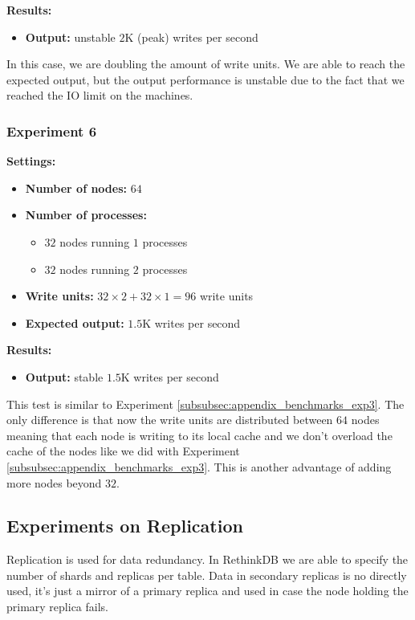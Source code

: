 \medskip
\noindent\textbf{Results:}
\begin{itemize}
 \item \textbf{Output:} unstable $2$K (peak) writes per second
\end{itemize}

In this case, we are doubling the amount of write units. 
We are able to reach the expected output, but the output performance is unstable due to the fact that we reached the IO limit on the machines. 

\subsubsection{Experiment 6}\label{subsubsec:appendix_benchmarks_exp6}
\medskip
\noindent\textbf{Settings:}
\begin{itemize}
 \item \textbf{Number of nodes:} $64$
 \item \textbf{Number of processes:}
 \begin{itemize}
  \item$32$ nodes running $1$ processes
  \item$32$ nodes running $2$ processes
 \end{itemize}
 \item \textbf{Write units:} $32 \times 2 + 32 \times 1 = 96$ write units
 \item \textbf{Expected output:} $1.5$K writes per second
\end{itemize}

\medskip
\noindent\textbf{Results:}
\begin{itemize}
 \item \textbf{Output:} stable $1.5$K writes per second
\end{itemize}

This test is similar to Experiment \ref{subsubsec:appendix_benchmarks_exp3}. 
The only difference is that now the write units are distributed between $64$ nodes meaning that each node is writing to its local cache and we don't overload the cache of the nodes like we did with Experiment \ref{subsubsec:appendix_benchmarks_exp3}. 
This is another advantage of adding more nodes beyond $32$.

\subsection{Experiments on Replication}

Replication is used for data redundancy.
In RethinkDB we are able to specify the number of shards and replicas per table.
Data in secondary replicas is no directly used, it’s just a mirror of a primary replica and used in case the node holding the primary replica fails.

